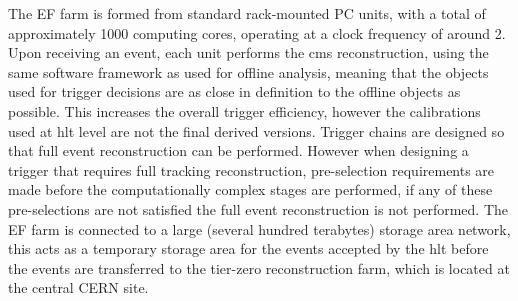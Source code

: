 The EF farm is formed from standard rack-mounted PC units, with a total of
approximately 1000 computing cores, operating at a clock frequency of around
\unit{2}{\giga\hertz}. Upon receiving an event, each unit performs the \ac{cms}
reconstruction, using the same software framework as used for offline analysis, meaning that the objects used for trigger decisions are as close in definition to the offline objects as possible. This increases the overall trigger efficiency, however the calibrations used at \ac{hlt} level are not the final derived versions.
Trigger chains are designed so that full event reconstruction can be performed.
However when designing a trigger that requires full tracking reconstruction, 
pre-selection requirements are made before the computationally complex stages 
are performed, if any of these pre-selections are not satisfied the full event 
reconstruction is not performed. The EF farm is connected to a large (several 
hundred terabytes) storage area network, this acts as a temporary storage area 
for the events accepted by the \ac{hlt} before the events are transferred to the tier-zero reconstruction farm, which is located at the central CERN site.



